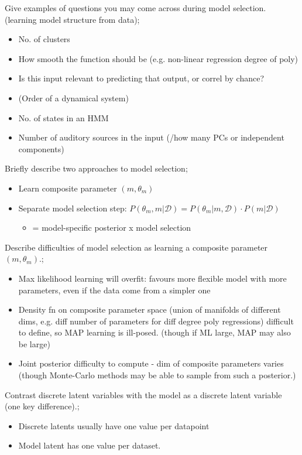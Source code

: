 \documentclass{article}
\begin{document}
Give examples of questions you may come across during model selection. (learning model structure from data); \begin{itemize} \item No. of clusters \item How smooth the function should be (e.g. non-linear regression degree of poly) \item Is this input relevant to predicting that output, or correl by chance?  \item (Order of a dynamical system) \item No. of states in an HMM \item Number of auditory sources in the input (/how many PCs or independent components) \end{itemize}

Briefly describe two approaches to model selection; \begin{itemize} \item Learn composite parameter $(m, \theta_m)$ \item Separate model selection step: $P(\theta_m, m|\mathcal{D})=P(\theta_m|m, \mathcal{D})\cdot P(m|\mathcal{D})$ \begin{itemize} \item = model-specific posterior x model selection \end{itemize} \end{itemize}

Describe difficulties of model selection as learning a composite parameter $(m, \theta_m)$.; \begin{itemize} \item Max likelihood learning will overfit: favours more flexible model with more parameters, even if the data come from a simpler one \item Density fn on composite parameter space (union of manifolds of different dims, e.g. diff number of parameters for diff degree poly regressions) difficult to define, so MAP learning is ill-posed. (though if ML large, MAP may also be large) \item Joint posterior difficulty to compute - dim of composite parameters varies (though Monte-Carlo methods may be able to sample from such a posterior.) \end{itemize}

Contrast discrete latent variables with the model as a discrete latent variable (one key difference).; \begin{itemize} \item Discrete latents usually have one value per datapoint \item Model latent has one value per dataset.  \end{itemize}
\end{document}
